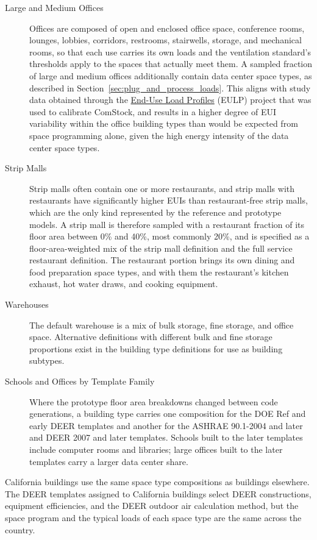\begin{description}
\item[Large and Medium Offices] Offices are composed of open and enclosed office space, conference rooms, lounges, lobbies, corridors, restrooms, stairwells, storage, and mechanical rooms, so that each use carries its own loads and the ventilation standard's thresholds apply to the spaces that actually meet them. A sampled fraction of large and medium offices additionally contain data center space types, as described in Section~\ref{sec:plug_and_process_loads}. This aligns with study data obtained through the \href{https://www.nrel.gov/docs/fy22osti/80889.pdf}{End-Use Load Profiles} (EULP) project that was used to calibrate ComStock, and results in a higher degree of EUI variability within the office building types than would be expected from space programming alone, given the high energy intensity of the data center space types.
\item[Strip Malls] Strip malls often contain one or more restaurants, and strip malls with restaurants have significantly higher EUIs than restaurant-free strip malls, which are the only kind represented by the reference and prototype models. A strip mall is therefore sampled with a restaurant fraction of its floor area between 0\% and 40\%, most commonly 20\%, and is specified as a floor-area-weighted mix of the strip mall definition and the full service restaurant definition. The restaurant portion brings its own dining and food preparation space types, and with them the restaurant's kitchen exhaust, hot water draws, and cooking equipment.
\item[Warehouses] The default warehouse is a mix of bulk storage, fine storage, and office space. Alternative definitions with different bulk and fine storage proportions exist in the building type definitions for use as building subtypes.
\item[Schools and Offices by Template Family] Where the prototype floor area breakdowns changed between code generations, a building type carries one composition for the DOE Ref and early DEER templates and another for the ASHRAE 90.1-2004 and later and DEER 2007 and later templates. Schools built to the later templates include computer rooms and libraries; large offices built to the later templates carry a larger data center share.
\end{description}

California buildings use the same space type compositions as buildings elsewhere. The DEER templates assigned to California buildings select DEER constructions, equipment efficiencies, and the DEER outdoor air calculation method, but the space program and the typical loads of each space type are the same across the country.

